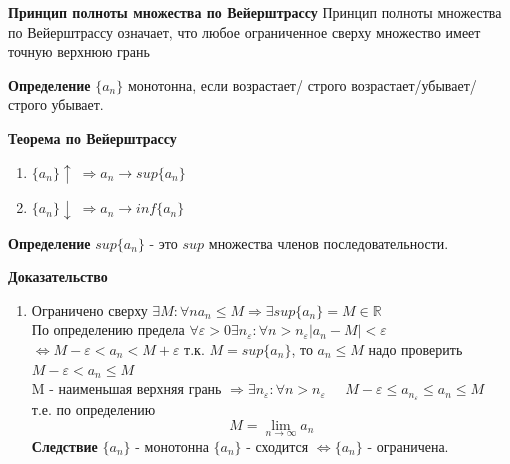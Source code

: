 \documentclass[12pt, a4paper]{article}
\newcommand{\R}{\mathbb{R}}
\begin{document}
\begin{tcolorbox}
    \textbf{Принцип полноты множества по Вейерштрассу}
    Принцип полноты множества по Вейерштрассу означает, что любое ограниченное сверху множество имеет точную верхнюю грань     
\end{tcolorbox}

\begin{tcolorbox}
    \textbf{Определение}
    $\{a_n\}$ монотонна, если возрастает/ строго возрастает/убывает/строго убывает.
\end{tcolorbox}

\begin{tcolorbox}
    \textbf{Теорема по Вейерштрассу}
    \begin{enumerate}
        \item $\{a_n\} \uparrow \; \Rightarrow a_n \to sup\{ a_n \}$
        \item $\{a_n\} \downarrow \; \Rightarrow a_n \to inf\{ a_n \}$
    \end{enumerate}
\end{tcolorbox}

\begin{tcolorbox}
    \textbf{Определение}
    $sup \{a_n\}$ - это $sup$ множества членов последовательности.
\end{tcolorbox}

\begin{tcolorbox}[title=Доказательство полноты $\R$ по Вейерштрассу]
    \textbf{Доказательство}
    \begin{enumerate}
        \item Ограничено сверху $\exists M: \forall n a_n \leq M \Rightarrow \exists sup\{a_n\} = M \in \R$\\
        По определению предела $\forall \varepsilon > 0 \exists n_\varepsilon: \forall n > n_\varepsilon |a_n - M| < \varepsilon $\\
        $\Leftrightarrow M-\varepsilon<a_n<M+\varepsilon$ т.к. $M=sup\{a_n\}$, то $a_n \leq M$ надо проверить $M-\varepsilon<a_n\leq M$\\
        M - наименьшая верхняя грань $\Rightarrow \exists n_\varepsilon: \forall n > n_\varepsilon \;\;\;\;\; M-\varepsilon \leq a_{n_\varepsilon} \leq a_n \leq M $\\
        т.е. по определению 
        \[M = \lim_{n\to\infty} a_n\]
        \textbf{Следствие} $\{a_n\}$ - монотонна $\{a_n\}$ - сходится $\Leftrightarrow \{a_n\}$ - ограничена.
    \end{enumerate}
\end{tcolorbox}
\end{document}
